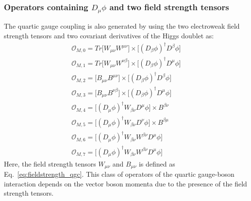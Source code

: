 \subsubsection{Operators containing $D_{\mu}\phi$ and two field strength tensors} %
\label{ssub:operators_containing_}
The quartic gauge coupling is also generated by using the two electroweak field strength tensors and two covariant derivatives of the Higgs doublet as:
\begin{eqnarray}
\mathcal{O}_{M,0}=Tr\Big[W_{\mu\nu}W^{\mu\nu}]\times \Big[(D_{\beta}\phi)^{\dagger}D^{\beta}\phi] \\
\mathcal{O}_{M,1}=Tr\Big[W_{\mu\nu}W^{\nu\beta}]\times \Big[(D_{\beta}\phi)^{\dagger}D^{\mu}\phi]\\
\mathcal{O}_{M,2}=\Big[B_{\mu\nu}B^{\mu\nu}]\times \Big[(D_{\beta}\phi)^{\dagger}D^{\beta}\phi]\\
\mathcal{O}_{M,3}=\Big[B_{\mu\nu}B^{\nu\beta}]\times \Big[(D_{\beta}\phi)^{\dagger}D^{\mu}\phi]\\
\mathcal{O}_{M,4}=\Big[(D_{\mu}\phi)^{\dagger}W_{\beta\nu}D^{\mu}\phi]\times B^{\beta\nu}\\
\mathcal{O}_{M,5}=\Big[(D_{\mu}\phi)^{\dagger}W_{\beta\nu}D^{\nu}\phi]\times B^{\beta\mu}\\
\mathcal{O}_{M,6}=\Big[(D_{\mu}\phi)^{\dagger}W_{\beta\nu}W^{\beta\nu}D^{\mu}\phi]\\
\mathcal{O}_{M,7}=\Big[(D_{\mu}\phi)^{\dagger}W_{\beta\nu}W^{\beta\nu}D^{\mu}\phi]
\end{eqnarray}
Here, the field strength tensors $W_{\mu \nu}$ and $B_{\mu \nu}$ is defined as Eq.~\ref{eq:fieldstrength_qgc}. This class of operators of the quartic gauge-boson interaction depends on the vector boson momenta due to the presence of the field strength tensors.

